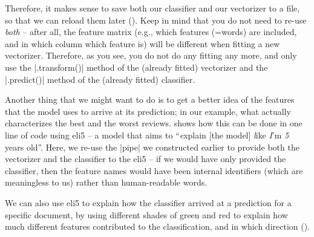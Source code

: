 Therefore, it makes sense to save both our classifier and our
vectorizer to a file, so that we can reload them later
(). Keep in mind that you do not need to re-use \emph{both}
-- after all, the feature matrix (e.g., which features (=words) are
included, and in which column which feature is) will be different when
fitting a new vectorizer. Therefore, as you see, you do not do any fitting any more, and only use the |.transform()| method of the (already fitted) vectorizer and the |.predict()| method of the (already fitted) classifier.




Another thing that we might want to do is to get a better idea of the
features that the model uses to arrive at its prediction; in our
example, what actually characterizes the best and the worst
reviews.  shows how this can be done in one line of code
using eli5 -- a model that aims to ``\emph{e}xplain [the model]
\emph{l}ike \emph{I}'m \emph{5} years old''. Here, we re-use the
|pipe| we constructed earlier to provide both the vectorizer and the
classifier to the eli5 -- if we would have only provided the
classifier, then the feature names would have been internal
identifiers (which are meaningless to us) rather than human-readable
words.


We can also use eli5 to explain how the classifier arrived at a
prediction for a specific document, by using different shades of green
and red to explain how much different features contributed to the
classification, and in which direction ().




